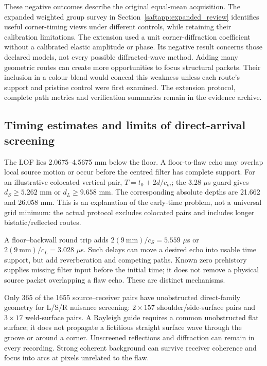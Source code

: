 These negative outcomes describe the original equal-mean acquisition. The expanded weighted group survey in Section~\ref{saftapp:expanded_review} identifies useful corner-timing views under different controls, while retaining their calibration limitations. The extension used a unit corner-diffraction coefficient without a calibrated elastic amplitude or phase. Its negative result concerns those declared models, not every possible diffracted-wave method. Adding many geometric routes can create more opportunities to focus structural packets. Their inclusion in a colour blend would conceal this weakness unless each route's support and pristine control were first examined. The extension protocol, complete path metrics and verification summaries remain in the evidence archive.

\subsection{Timing estimates and limits of direct-arrival screening}
The LOF lies 2.0675--4.5675 mm below the floor. A floor-to-flaw echo may overlap local source motion or occur before the centred filter has complete support. For an illustrative colocated vertical pair, $T=t_0+2d/c_m$; the 3.28 $\mu$s guard gives $d_S\ge5.262$ mm or $d_L\ge9.658$ mm. The corresponding absolute depths are 21.662 and 26.058 mm. This is an explanation of the early-time problem, not a universal grid minimum: the actual protocol excludes colocated pairs and includes longer bistatic/reflected routes.

A floor--backwall round trip adds $2(9~\mathrm{mm})/c_S=5.559$ $\mu$s or $2(9~\mathrm{mm})/c_L=3.028$ $\mu$s. Such delays can move a desired echo into usable time support, but add reverberation and competing paths. Known zero prehistory supplies missing filter input before the initial time; it does not remove a physical source packet overlapping a flaw echo. These are distinct mechanisms.

Only 365 of the 1655 source--receiver pairs have unobstructed direct-family geometry for L/S/R nuisance screening: $2\times157$ shoulder/side-surface pairs and $3\times17$ weld-surface pairs. A Rayleigh guide requires a common unobstructed flat surface; it does not propagate a fictitious straight surface wave through the groove or around a corner. Unscreened reflections and diffraction can remain in every recording. Strong coherent background can survive receiver coherence and focus into arcs at pixels unrelated to the flaw.


